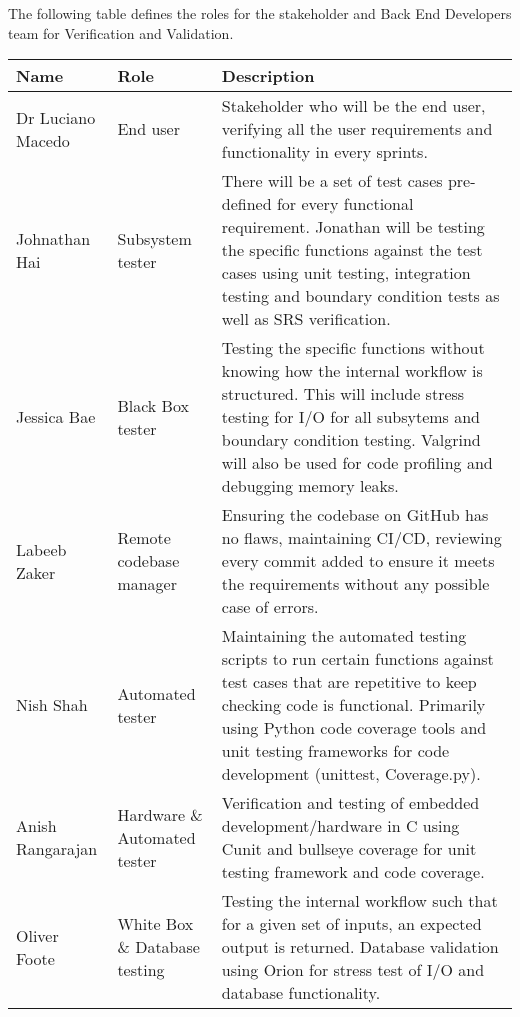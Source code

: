\documentclass[12pt, titlepage]{article}
\begin{document}
The following table defines the roles for the stakeholder and Back End Developers team for Verification and Validation.
\begin{center}
\begin{tabular}{|m{5em}|m{5em}|m{25em}|}

  \hline
  \textbf{Name}     & \textbf{Role}           & \textbf{Description}                                                                                                                                                                        \\
  \hline
  Dr Luciano Macedo & End user                & Stakeholder who will be the end user, verifying all the user requirements and functionality in every sprints.                                                                                                             \\
  \hline
  Johnathan Hai     & Subsystem tester       & There will be a set of test cases pre-defined for every functional requirement. Jonathan will be testing the specific functions against the test cases using unit testing, integration testing and boundary condition tests as well as SRS verification. \\
  \hline
  Jessica Bae       & Black Box tester        & Testing the specific functions without knowing how the internal workflow is structured. This will include stress testing for I/O for all subsytems and boundary condition testing. Valgrind will also be used for code profiling and debugging memory leaks.                                                                                         \\
  \hline
  Labeeb Zaker      & Remote codebase manager & Ensuring the codebase on GitHub has no flaws, maintaining CI/CD, reviewing every commit added to ensure it meets the requirements without any possible case of errors. \\
  \hline
  Nish Shah         & Automated tester        & Maintaining the automated testing scripts to run certain functions against test cases that are repetitive to keep checking code is functional. Primarily using Python code coverage tools and unit testing frameworks for code development (unittest, Coverage.py).                                                          \\
  \hline
  Anish Rangarajan  & Hardware \& Automated tester    & Verification and testing of embedded development/hardware in C using Cunit and bullseye coverage for unit testing framework and code coverage.\\
  \hline
  Oliver Foote      & White Box \& Database testing        & Testing the internal workflow such that for a given set of inputs, an expected output is returned. Database validation using Orion for stress test of I/O and database functionality. \\
  \hline

\end{tabular}
  \end{center}
\end{document}
